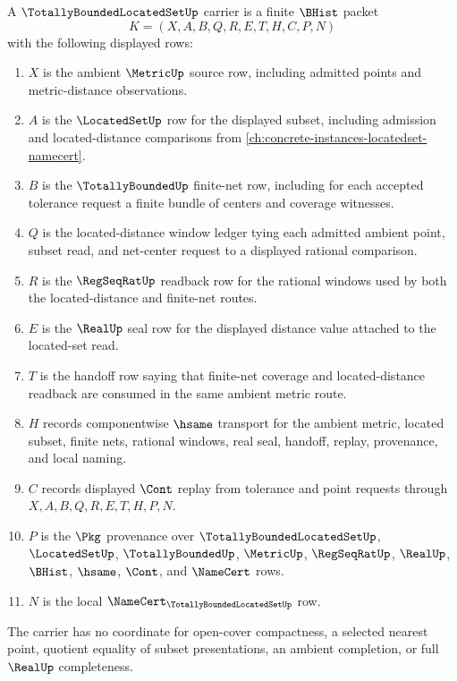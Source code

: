 \begin{definition}
\label{def:totally-bounded-located-set-carrier}
A $\TotallyBoundedLocatedSetUp$ carrier is a finite $\BHist$ packet
$$
K=(X,A,B,Q,R,E,T,H,C,P,N)
$$
with the following displayed rows:
\begin{enumerate}
\item $X$ is the ambient $\MetricUp$ source row, including admitted points and metric-distance observations.
\item $A$ is the $\LocatedSetUp$ row for the displayed subset, including admission and located-distance comparisons from \autoref{ch:concrete-instances-locatedset-namecert}.
\item $B$ is the $\TotallyBoundedUp$ finite-net row, including for each accepted tolerance request a finite bundle of centers and coverage witnesses.
\item $Q$ is the located-distance window ledger tying each admitted ambient point, subset read, and net-center request to a displayed rational comparison.
\item $R$ is the $\RegSeqRatUp$ readback row for the rational windows used by both the located-distance and finite-net routes.
\item $E$ is the $\RealUp$ seal row for the displayed distance value attached to the located-set read.
\item $T$ is the handoff row saying that finite-net coverage and located-distance readback are consumed in the same ambient metric route.
\item $H$ records componentwise $\hsame$ transport for the ambient metric, located subset, finite nets, rational windows, real seal, handoff, replay, provenance, and local naming.
\item $C$ records displayed $\Cont$ replay from tolerance and point requests through $X,A,B,Q,R,E,T,H,P,N$.
\item $P$ is the $\Pkg$ provenance over $\TotallyBoundedLocatedSetUp$, $\LocatedSetUp$, $\TotallyBoundedUp$, $\MetricUp$, $\RegSeqRatUp$, $\RealUp$, $\BHist$, $\hsame$, $\Cont$, and $\NameCert$ rows.
\item $N$ is the local $\NameCert_{\TotallyBoundedLocatedSetUp}$ row.
\end{enumerate}
The carrier has no coordinate for open-cover compactness, a selected nearest point, quotient equality of subset presentations, an ambient completion, or full $\RealUp$ completeness.
\end{definition}

